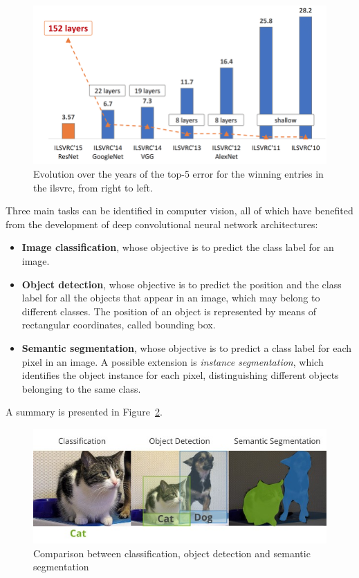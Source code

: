 \documentclass[%
    corpo=12pt,
    twoside,
    stile=classica,   
    tipotesi=magistrale,
    evenboxes,
    english,
	numerazioneromana,
]{toptesi}
\begin{document}
\begin{figure}[ht]
	\centering
	\includegraphics[width=.8\textwidth]{imgs/ILSVRC.png}
	\caption[Evolution of top-5 error for the winning entries in \gls{ilsvrc}]{Evolution over the years of the top-5 error for the winning entries in the \gls{ilsvrc}, from right to left\cite{russakovsky2015imagenet}\cite{hanqing2020research}.
	\label{fig:imagenet}}
\end{figure}

\bigskip
Three main tasks can be identified in computer vision, all of which have benefited from the development of deep convolutional neural network architectures:

\begin{itemize}
	\item \textbf{Image classification}, whose objective is to predict the class label for an image.
	\item \textbf{Object detection}, whose objective is to predict the position and the class label for all the objects that appear in an image, which may belong to different classes. The position of an object is represented by means of rectangular coordinates, called bounding box.
	\item \textbf{Semantic segmentation}, whose objective is to predict a class label for each pixel in an image. A possible extension is \textit{instance segmentation}, which identifies the object instance for each pixel, distinguishing different objects belonging to the same class.
\end{itemize}

A summary is presented in Figure~\ref{fig:classdetseg}.

\begin{figure}
	\centering
	\includegraphics[width=.9\textwidth]{imgs/classification_detection_segmentaion.jpeg}
	\caption[Comparison between classification, object detection and semantic segmentation]{Comparison between classification, object detection and semantic segmentation}
	\label{fig:classdetseg}
\end{figure}
\end{document}
